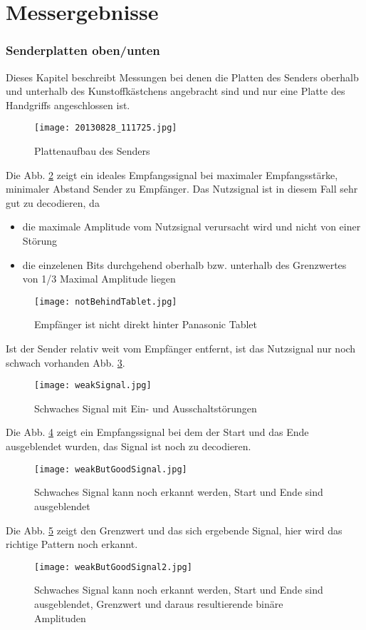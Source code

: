 \documentclass[10pt]{scrartcl}
\begin{document}
\clearpage
\newpage


\part{Messergebnisse}


\section{Senderplatten oben/unten}
Dieses Kapitel beschreibt Messungen bei denen die Platten des Senders oberhalb und unterhalb des Kunstoffkästchens angebracht sind und nur eine Platte des Handgriffs angeschlossen ist.
\begin{figure}[h!]
	\centering
	\texttt{[image: 20130828\_111725.jpg]}
	\caption{Plattenaufbau des Senders}
	\label{img:SenderPlattenObenUnten}
\end{figure}

Die Abb. \ref{img:IdealesEmpfangssignal} zeigt ein ideales Empfangssignal bei maximaler Empfangsstärke, minimaler Abstand Sender zu Empfänger. Das Nutzsignal ist in diesem Fall sehr gut zu decodieren, da
\begin{itemize}
\item die maximale Amplitude vom Nutzsignal verursacht wird und nicht von einer Störung 
\item die einzelenen Bits durchgehend oberhalb bzw. unterhalb des Grenzwertes von 1/3 Maximal Amplitude liegen
\end{itemize} 
\begin{figure}[h!]
	\centering
	\texttt{[image: notBehindTablet.jpg]}
	\caption{Empfänger ist nicht direkt hinter Panasonic Tablet}
	\label{img:IdealesEmpfangssignal}
\end{figure}
Ist der Sender relativ weit vom Empfänger entfernt, ist das Nutzsignal nur noch schwach vorhanden Abb. \ref{img:schwachesSignal}.
\begin{figure}[h!]
	\centering
	\texttt{[image: weakSignal.jpg]}
	\caption{Schwaches Signal mit Ein- und Ausschaltstörungen}
	\label{img:schwachesSignal}
\end{figure}
Die Abb. \ref{img:StartEndeCut} zeigt ein Empfangssignal bei dem der Start und das Ende ausgeblendet wurden, das Signal ist noch zu decodieren.
\begin{figure}[h!]
	\centering
	\texttt{[image: weakButGoodSignal.jpg]}
	\caption{Schwaches Signal kann noch erkannt werden, Start und Ende sind ausgeblendet}
	\label{img:StartEndeCut}
\end{figure}
Die Abb. \ref{img:StartEndeCut2} zeigt den Grenzwert und das sich ergebende Signal, hier wird das richtige Pattern noch erkannt.
\begin{figure}[h!]
	\centering
	\texttt{[image: weakButGoodSignal2.jpg]}
	\caption{Schwaches Signal kann noch erkannt werden, Start und Ende sind ausgeblendet, Grenzwert und daraus resultierende binäre Amplituden}
	\label{img:StartEndeCut2}
\end{figure}
\end{document}

